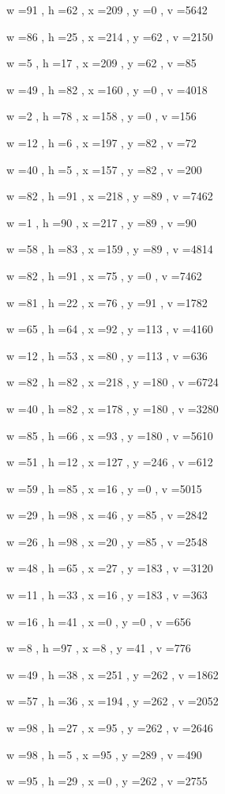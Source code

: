 \documentclass[11pt]{article}
\begin{document}
w =91 , h =62 , x =209 , y =0 , v =5642
\par
w =86 , h =25 , x =214 , y =62 , v =2150
\par
w =5 , h =17 , x =209 , y =62 , v =85
\par
w =49 , h =82 , x =160 , y =0 , v =4018
\par
w =2 , h =78 , x =158 , y =0 , v =156
\par
w =12 , h =6 , x =197 , y =82 , v =72
\par
w =40 , h =5 , x =157 , y =82 , v =200
\par
w =82 , h =91 , x =218 , y =89 , v =7462
\par
w =1 , h =90 , x =217 , y =89 , v =90
\par
w =58 , h =83 , x =159 , y =89 , v =4814
\par
w =82 , h =91 , x =75 , y =0 , v =7462
\par
w =81 , h =22 , x =76 , y =91 , v =1782
\par
w =65 , h =64 , x =92 , y =113 , v =4160
\par
w =12 , h =53 , x =80 , y =113 , v =636
\par
w =82 , h =82 , x =218 , y =180 , v =6724
\par
w =40 , h =82 , x =178 , y =180 , v =3280
\par
w =85 , h =66 , x =93 , y =180 , v =5610
\par
w =51 , h =12 , x =127 , y =246 , v =612
\par
w =59 , h =85 , x =16 , y =0 , v =5015
\par
w =29 , h =98 , x =46 , y =85 , v =2842
\par
w =26 , h =98 , x =20 , y =85 , v =2548
\par
w =48 , h =65 , x =27 , y =183 , v =3120
\par
w =11 , h =33 , x =16 , y =183 , v =363
\par
w =16 , h =41 , x =0 , y =0 , v =656
\par
w =8 , h =97 , x =8 , y =41 , v =776
\par
w =49 , h =38 , x =251 , y =262 , v =1862
\par
w =57 , h =36 , x =194 , y =262 , v =2052
\par
w =98 , h =27 , x =95 , y =262 , v =2646
\par
w =98 , h =5 , x =95 , y =289 , v =490
\par
w =95 , h =29 , x =0 , y =262 , v =2755
\par
\newpage
\end{document}
